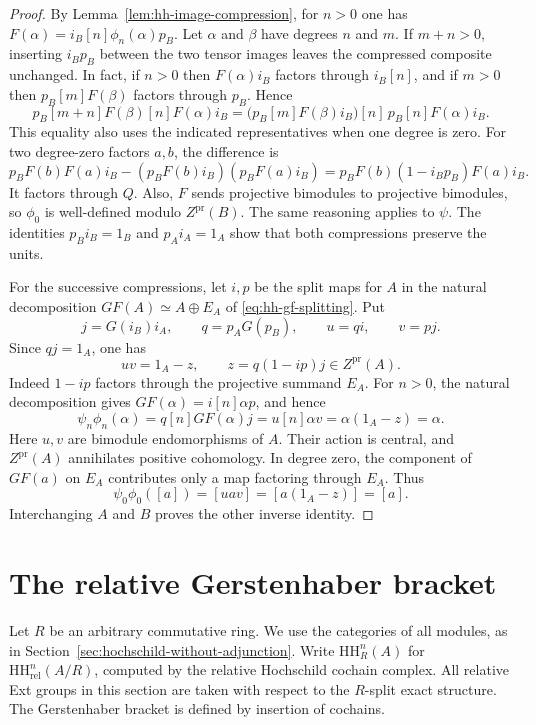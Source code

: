 \documentclass[12pt,a4paper,english,reqno]{amsart}
\numberwithin{equation}{section}
\theoremstyle{plain}
\theoremstyle{definition}
\begin{document}
\begin{proof}
By Lemma~\ref{lem:hh-image-compression}, for $n>0$ one has
$F(\alpha)=i_B[n]\phi_n(\alpha)p_B$. Let $\alpha$ and $\beta$ have degrees $n$ and $m$. If $m+n>0$,
inserting $i_Bp_B$ between the two tensor images leaves the
compressed composite unchanged. In fact, if $n>0$ then
$F(\alpha)i_B$ factors through $i_B[n]$, and if $m>0$ then
$p_B[m]F(\beta)$ factors through $p_B$. Hence
\[
 p_B[m+n]F(\beta)[n]F(\alpha)i_B
  =\bigl(p_B[m]F(\beta)i_B\bigr)[n]\,
       p_B[n]F(\alpha)i_B .
\]
This equality also uses the indicated representatives when
one degree is zero. For two degree-zero factors $a,b$, the
difference is
\[
 p_BF(b)F(a)i_B-(p_BF(b)i_B)(p_BF(a)i_B)
   =p_BF(b)(1-i_Bp_B)F(a)i_B.
\]
It factors through $Q$. Also, $F$ sends projective bimodules to
projective bimodules, so $\phi_0$ is well-defined modulo
$Z^{\mathrm{pr}}(B)$. The same reasoning applies to $\psi$.
The identities $p_Bi_B=1_B$ and $p_Ai_A=1_A$ show that both
compressions preserve the units.

For the successive compressions, let $i,p$ be the split maps for
$A$ in the natural decomposition $GF(A)\simeq A\oplus E_A$ of
\eqref{eq:hh-gf-splitting}. Put
\[
 j=G(i_B)i_A,\qquad q=p_AG(p_B),\qquad
 u=qi,\qquad v=pj.
\]
Since $qj=1_A$, one has
\[
 uv=1_A-z,\qquad z=q(1-ip)j\in Z^{\mathrm{pr}}(A).
\]
Indeed $1-ip$ factors through the projective summand $E_A$.
For $n>0$, the natural decomposition gives
$GF(\alpha)=i[n]\alpha p$, and hence
\[
 \psi_n\phi_n(\alpha)
   =q[n]GF(\alpha)j=u[n]\alpha v
   =\alpha(1_A-z)=\alpha.
\]
Here $u,v$ are bimodule endomorphisms of $A$. Their action is
central, and $Z^{\mathrm{pr}}(A)$ annihilates positive cohomology.
In degree zero, the component of $GF(a)$ on $E_A$ contributes
only a map factoring through $E_A$. Thus
\[
 \psi_0\phi_0([a])=[uav]=[a(1_A-z)]=[a].
\]
Interchanging $A$ and $B$ proves the other inverse identity.
\end{proof}

\section{The relative Gerstenhaber bracket}
\label{sec:relative-gerstenhaber}

Let $R$ be an arbitrary commutative ring. We use the categories of
all modules, as in Section~\ref{sec:hochschild-without-adjunction}.
Write $\mathrm{HH}^n_R(A)$ for
$\mathrm{HH}^n_{\mathrm{rel}}(A/R)$, computed by the relative
Hochschild cochain complex. All relative Ext groups in this section
are taken with respect to the $R$-split exact structure. The
Gerstenhaber bracket is defined by insertion of cochains.
\end{document}

